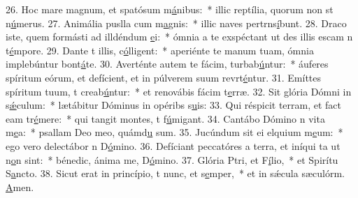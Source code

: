 26. Hoc mare magnum, et spatósum m\uline{á}nibus:~* illic reptília, quorum non st n\uline{ú}merus.
27. Animália puslla cum m\uline{a}gnis:~* illic naves pertrns\uline{í}bunt.
28. Draco iste, quem formásti ad illdéndum \uline{e}i:~* ómnia a te exspéctant ut des illis escam n t\uline{é}mpore.
29. Dante t illis, c\uline{ó}lligent:~* aperiénte te manum tuam, ómnia implebúntur bont\uline{á}te.
30. Averténte autem te fácim, turbab\uline{ú}ntur:~* áuferes spíritum eórum, et defícient, et in púlverem suum revrt\uline{é}ntur.
31. Emíttes spíritum tuum, t creab\uline{ú}ntur:~* et renovábis fácim t\uline{e}rræ.
32. Sit glória Dómni in s\uline{ǽ}culum:~* lætábitur Dóminus in opéribs s\uline{u}is:
33. Qui réspicit terram, et fact eam tr\uline{é}mere:~* qui tangit montes, t f\uline{ú}migant.
34. Cantábo Dómino n vita m\uline{e}a:~* psallam Deo meo, quámd\uline{u} sum.
35. Jucúndum sit ei elquium m\uline{e}um:~* ego vero delectábor n D\uline{ó}mino.
36. Defíciant peccatóres a terra, et iníqui ta ut n\uline{o}n sint:~* bénedic, ánima me, D\uline{ó}mino.
37. Glória Ptri, et F\uline{í}lio,~* et Spirítu S\uline{a}ncto.
38. Sicut erat in princípio, t nunc, et s\uline{e}mper,~* et in sǽcula sæculórm. \uline{A}men.
